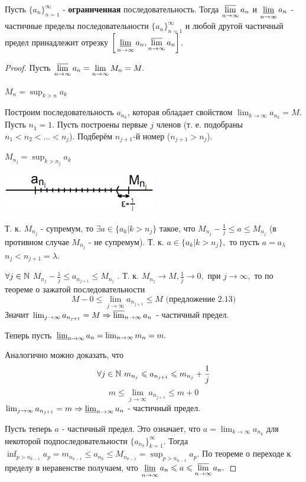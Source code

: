 	\begin{theorem}
		Пусть $\{a_n\}^{\infty}_{n = 1}$ - \textbf{ограниченная} последовательность. Тогда $\displaystyle \operatorname*{\overline{lim}}_{n \to \infty} a_n$ и $\displaystyle \operatorname*{\underline{lim}}_{n \to \infty} a_n$ - частичные пределы последовательности $\{a_n\}^{\infty}_{n = 1}$ и любой другой частичный предел принадлежит отрезку $\displaystyle \bigg[\operatorname*{\underline{lim}}_{n \to \infty} a_n, \operatorname*{\overline{lim}}_{n \to \infty} a_n\bigg]$.
	\end{theorem}
	
	\begin{proof}
		Пусть $\displaystyle \operatorname*{\overline{lim}}_{n \to \infty} a_n = \lim_{n \to \infty} M_n = M.$
		
		$M_n = \sup_{k > n} a_k$
		
		Построим последовательность $a_{n_k}$, которая обладает свойством $\lim_{k \to \infty} a_{n_k} = M$. Пусть $n_1 = 1.$ Пусть построены первые $j$ членов (т. е. подобраны $n_1 < n_2 < ... < n_j$). Подберём $n_{j + 1}$-й номер ($n_{j + 1} > n_{j}$).
		
		$M_{n_j} = \sup_{k > n_j} a_k$
		
		\begin{center}
			\includegraphics[width=0.5\textwidth]{img/lecture5/theorem_bolcano}
		\end{center}
		
		Т. к. $M_{n_j}$ - супремум, то $\exists a \in \{a_k | k > n_j\}$ такое, что
		$M_{n_j} - \frac{1}{j} \leqslant a \leqslant M_{n_j}$ (в противном случае $M_{n_j}$ - не супремум). Т. к. $a \in \{a_k | k > n_j\},$ то пусть $a = a_{\lambda}$ $n_j < n_{j + 1} = \lambda.$
		
		$\forall j \in \mathbb N$ $M_{n_j} - \frac{1}{j} \leqslant a_{n_{j + 1}} \leqslant M_{n_j}$ . Т. к. $M_{n_j} \to M, \frac{1}{j} \to 0,$ при $j \to \infty,$ то по теореме о зажатой последовательности
		\[ M - 0 \leqslant \lim_{j \to \infty} a_{n_{j + 1}} \leqslant M \text{ (предложение 2.13)} \]
		Значит $\lim_{j \to \infty} a_{n_{j + 1}} = M \Rightarrow \operatorname*{\overline{lim}}_{n \to \infty} a_n$ - частичный предел.
		
		Теперь пусть $\operatorname*{\underline{lim}}_{n \to \infty} a_n = \lim_{n \to \infty} m_n = m.$
		
		Аналогично можно доказать, что
		\[ \forall j \in \mathbb N \text{ } m_{n_j} \leqslant a_{n_{j + 1}} \leqslant m_{n_j} + \frac{1}{j} \]
		\[ m \leqslant \lim_{j \to \infty} a_{n_{j + 1}} \leqslant m + 0 \]
		$\lim_{j \to \infty} a_{n_{j + 1}} = m \Rightarrow \operatorname*{\underline{lim}}_{n \to \infty} a_n$ - частичный предел.
		
		Пусть теперь $a$ - частичный предел. Это означает, что $a = \lim_{k \to \infty} a_{n_k}$ для некоторой подпоследовательности $\{a_{n_k}\}^{\infty}_{k = 1}.$ Тогда $\displaystyle \inf_{p > n_{k - 1}} a_p = m_{n_{k - 1}} \leqslant a_{n_k} \leqslant M_{n_{k - 1}} = \sup_{p > n_{k - 1}} a_p.$ По теореме о переходе к пределу в неравенстве получаем, что $\displaystyle \operatorname*{\underline{lim}}_{n \to \infty} a_n \leqslant a \leqslant \operatorname*{\overline{lim}}_{n \to \infty} a_n.$
	\end{proof}
	

